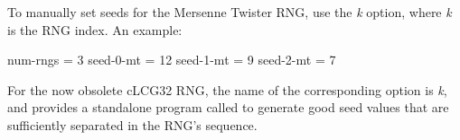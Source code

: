 To manually set seeds for the Mersenne Twister RNG, use the \textit{k}
option, where \textit{k} is the RNG index. An example:

\begin{inifile}
[General]
num-rngs = 3
seed-0-mt = 12
seed-1-mt = 9
seed-2-mt = 7
\end{inifile}

\label{sec:ch-config-sim:seedtool}

For the now obsolete cLCG32 RNG, the name of the corresponding option is
\textit{k}, and {\opp} provides a standalone program
called  to generate good seed values that
are sufficiently separated in the RNG's sequence.


